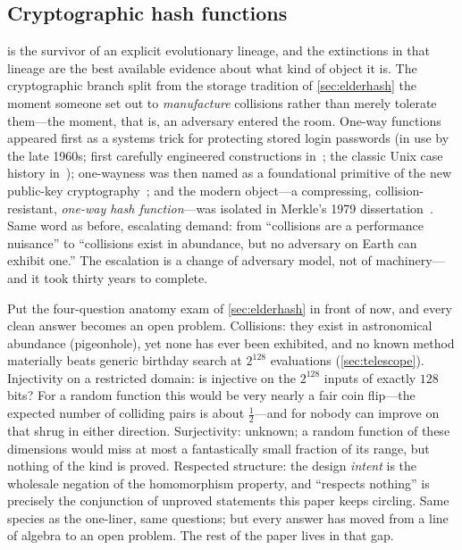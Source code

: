 \subsection{Cryptographic hash functions}\label{sec:falling}

\SHA{} is the survivor of an explicit evolutionary lineage, and the
extinctions in that lineage are the best available evidence about what
kind of object it is. The cryptographic branch split from the storage
tradition of \cref{sec:elderhash} the moment someone set out to
\emph{manufacture} collisions rather than merely tolerate them---the
moment, that is, an adversary entered the room. One-way functions
appeared first as a systems trick for protecting stored login passwords
(in use by the late 1960s; first carefully engineered constructions
in~\citealp{Purdy1974}; the classic Unix case history
in~\citealp{MorrisThompson1979}); one-wayness was then named as a
foundational primitive of the new public-key
cryptography~\citep{DiffieHellman1976}; and the modern object---a
compressing, collision-resistant, \emph{one-way hash function}---was
isolated in Merkle's 1979 dissertation~\citep{Merkle1979}. Same word as
before, escalating demand: from ``collisions are a performance nuisance''
to ``collisions exist in abundance, but no adversary on Earth can exhibit
one.'' The escalation is a change of adversary model, not of
machinery---and it took thirty years to complete.

Put the four-question anatomy exam of \cref{sec:elderhash} in front of
\SHA{} now, and every clean answer becomes an open problem.
Collisions: they exist in astronomical abundance (pigeonhole), yet none
has ever been exhibited, and no known method materially beats generic
birthday search at $2^{128}$ evaluations (\cref{sec:telescope}).
Injectivity on a restricted domain: is \SHA{} injective on the
$2^{128}$ inputs of exactly $128$ bits? For a random function this
would be very nearly a fair coin flip---the expected number of
colliding pairs is about $\tfrac12$---and for \SHA{} nobody can improve
on that shrug in either direction. Surjectivity: unknown; a random
function of these dimensions would miss at most a fantastically small
fraction of its range, but nothing of the kind is proved. Respected
structure: the design \emph{intent} is the wholesale negation of the
homomorphism property, and ``respects nothing'' is precisely the
conjunction of unproved statements this paper keeps circling. Same
species as the one-liner, same questions; but every answer has moved
from a line of algebra to an open problem. The rest of the paper lives
in that gap.

